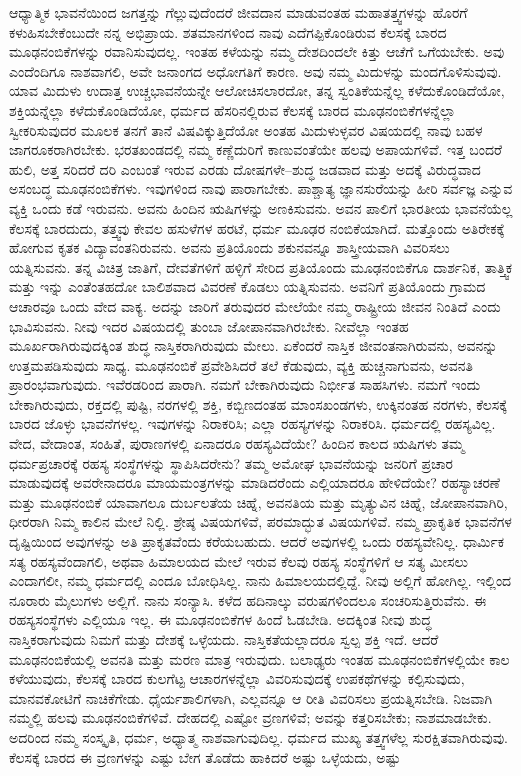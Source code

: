 ಆಧ್ಯಾತ್ಮಿಕ ಭಾವನೆಯಿಂದ ಜಗತ್ತನ್ನು ಗೆಲ್ಲುವುದೆಂದರೆ ಜೀವದಾನ ಮಾಡುವಂತಹ ಮಹಾತತ್ತ್ವಗಳನ್ನು ಹೊರಗೆ ಕಳುಹಿಸಬೇಕೆಂಬುದೇ ನನ್ನ ಅಭಿಪ್ರಾಯ. ಶತಮಾನಗಳಿಂದ ನಾವು ಎದೆಗಪ್ಪಿಕೊಂಡಿರುವ ಕೆಲಸಕ್ಕೆ ಬಾರದ ಮೂಢನಂಬಿಕೆಗಳನ್ನು ರವಾನಿಸುವುದಲ್ಲ. ಇಂತಹ ಕಳೆಯನ್ನು ನಮ್ಮ ದೇಶದಿಂದಲೇ ಕಿತ್ತು ಆಚೆಗೆ ಒಗೆಯಬೇಕು. ಅವು ಎಂದೆಂದಿಗೂ ನಾಶವಾಗಲಿ, ಅವೇ ಜನಾಂಗದ ಅಧೋಗತಿಗೆ ಕಾರಣ. ಅವು ನಮ್ಮ ಮಿದುಳನ್ನು ಮಂದಗೊಳಿಸುವುವು. ಯಾವ ಮಿದುಳು ಉದಾತ್ತ ಉಚ್ಚಭಾವನೆಯನ್ನೇ ಆಲೋಚಿಸಲಾರದೋ, ತನ್ನ ಸ್ವಂತಿಕೆಯನ್ನೆಲ್ಲ ಕಳೆದುಕೊಂಡಿದೆಯೋ, ಶಕ್ತಿಯನ್ನೆಲ್ಲಾ ಕಳೆದುಕೊಂಡಿದೆಯೋ, ಧರ್ಮದ ಹೆಸರಿನಲ್ಲಿರುವ ಕೆಲಸಕ್ಕೆ ಬಾರದ ಮೂಢನಂಬಿಕೆಗಳನ್ನೆಲ್ಲಾ ಸ್ವೀಕರಿಸುವುದರ ಮೂಲಕ ತನಗೆ ತಾನೆ ವಿಷವಿಕ್ಕುತ್ತಿದೆಯೋ ಅಂತಹ ಮಿದುಳುಳ್ಳವರ ವಿಷಯದಲ್ಲಿ ನಾವು ಬಹಳ ಜಾಗರೂಕರಾಗಿರಬೇಕು. ಭರತಖಂಡದಲ್ಲಿ ನಮ್ಮ ಕಣ್ಣೆದುರಿಗೆ ಕಾಣುವಂತೆಯೇ ಹಲವು ಅಪಾಯಗಳಿವೆ. ಇತ್ತ ಬಂದರೆ ಹುಲಿ, ಅತ್ತ ಸರಿದರೆ ದರಿ ಎಂಬಂತೆ ಇರುವ ಎರಡು ದೋಷಗಳೇ–ಶುದ್ಧ ಜಡವಾದ ಮತ್ತು ಅದಕ್ಕೆ ವಿರುದ್ಧವಾದ ಅಸಂಬದ್ಧ ಮೂಢನಂಬಿಕೆಗಳು. ಇವುಗಳಿಂದ ನಾವು ಪಾರಾಗಬೇಕು. ಪಾಶ್ಚಾತ್ಯ ಜ್ಞಾನಸುರೆಯನ್ನು ಹೀರಿ ಸರ್ವಜ್ಞ ಎನ್ನುವ ವ್ಯಕ್ತಿ ಒಂದು ಕಡೆ ಇರುವನು. ಅವನು ಹಿಂದಿನ ಋಷಿಗಳನ್ನು ಅಣಕಿಸುವನು. ಅವನ ಪಾಲಿಗೆ ಭಾರತೀಯ ಭಾವನೆಯೆಲ್ಲ ಕೆಲಸಕ್ಕೆ ಬಾರದುದು, ತತ್ತ್ವವು ಕೇವಲ ಹಸುಳೆಗಳ ಹರಟೆ, ಧರ್ಮ ಮೂಢರ ನಂಬಿಕೆಯಾಗಿದೆ. ಮತ್ತೊಂದು ಅತಿರೇಕಕ್ಕೆ ಹೋಗುವ ಕೃತಕ ವಿದ್ಯಾವಂತನಿರುವನು. ಅವನು ಪ್ರತಿಯೊಂದು ಶಕುನವನ್ನೂ ಶಾಸ್ತ್ರೀಯವಾಗಿ ವಿವರಿಸಲು ಯತ್ನಿಸುವನು. ತನ್ನ ವಿಚಿತ್ರ ಜಾತಿಗೆ, ದೇವತೆಗಳಿಗೆ ಹಳ್ಳಿಗೆ ಸೇರಿದ ಪ್ರತಿಯೊಂದು ಮೂಢನಂಬಿಕೆಗೂ ದಾರ್ಶನಿಕ, ತಾತ್ತ್ವಿಕ ಮತ್ತು ಇನ್ನು ಎಂತೆಂತಹದೋ ಬಾಲಿಶವಾದ ವಿವರಣೆ ಕೊಡಲು ಯತ್ನಿಸುವನು. ಅವನಿಗೆ ಪ್ರತಿಯೊಂದು ಗ್ರಾಮದ ಆಚಾರವೂ ಒಂದು ವೇದ ವಾಕ್ಯ. ಅದನ್ನು ಜಾರಿಗೆ ತರುವುದರ ಮೇಲೆಯೇ ನಮ್ಮ ರಾಷ್ಟ್ರೀಯ ಜೀವನ ನಿಂತಿದೆ ಎಂದು ಭಾವಿಸುವನು. ನೀವು ಇದರ ವಿಷಯದಲ್ಲಿ ತುಂಬಾ ಜೋಪಾನವಾಗಿರಬೇಕು. ನೀವೆಲ್ಲಾ ಇಂತಹ ಮೂರ್ಖರಾಗಿರುವುದಕ್ಕಿಂತ ಶುದ್ಧ ನಾಸ್ತಿಕರಾಗಿರುವುದು ಮೇಲು. ಏಕೆಂದರೆ ನಾಸ್ತಿಕ ಜೀವಂತನಾಗಿರುವನು, ಅವನನ್ನು ಉತ್ತಮಪಡಿಸುವುದು ಸಾಧ್ಯ. ಮೂಢನಂಬಿಕೆ ಪ್ರವೇಶಿಸಿದರೆ ತಲೆ ಕೆಡುವುದು, ವ್ಯಕ್ತಿ ಹುಚ್ಚನಾಗುವನು, ಅವನತಿ ಪ್ರಾರಂಭವಾಗುವುದು. ಇವೆರಡರಿಂದ ಪಾರಾಗಿ. ನಮಗೆ ಬೇಕಾಗಿರುವುದು ನಿರ್ಭೀತ ಸಾಹಸಿಗಳು. ನಮಗೆ ಇಂದು ಬೇಕಾಗಿರುವುದು, ರಕ್ತದಲ್ಲಿ ಪುಷ್ಟಿ, ನರಗಳಲ್ಲಿ ಶಕ್ತಿ, ಕಬ್ಬಿಣದಂತಹ ಮಾಂಸಖಂಡಗಳು, ಉಕ್ಕಿನಂತಹ ನರಗಳು, ಕೆಲಸಕ್ಕೆ ಬಾರದ ಜೊಳ್ಳು ಭಾವನೆಗಳಲ್ಲ. ಇವುಗಳನ್ನು ನಿರಾಕರಿಸಿ; ಎಲ್ಲಾ ರಹಸ್ಯಗಳನ್ನು ನಿರಾಕರಿಸಿ. ಧರ್ಮದಲ್ಲಿ ರಹಸ್ಯವಿಲ್ಲ. ವೇದ, ವೇದಾಂತ, ಸಂಹಿತೆ, ಪುರಾಣಗಳಲ್ಲಿ ಏನಾದರೂ ರಹಸ್ಯವಿದೆಯೇ? ಹಿಂದಿನ ಕಾಲದ ಋಷಿಗಳು ತಮ್ಮ ಧರ್ಮಪ್ರಚಾರಕ್ಕೆ ರಹಸ್ಯ ಸಂಸ್ಥೆಗಳನ್ನು ಸ್ಥಾಪಿಸಿದರೇನು? ತಮ್ಮ ಅಮೋಘ ಭಾವನೆಯನ್ನು ಜನರಿಗೆ ಪ್ರಚಾರ ಮಾಡುವುದಕ್ಕೆ ಅವರೇನಾದರೂ ಮಾಯಮಂತ್ರಗಳನ್ನು ಮಾಡಿದರೆಂದು ಎಲ್ಲಿಯಾದರೂ ಹೇಳಿದೆಯೇ? ರಹಸ್ಯಾಚರಣೆ ಮತ್ತು ಮೂಢನಂಬಿಕೆ ಯಾವಾಗಲೂ ದುರ್ಬಲತೆಯ ಚಿಹ್ನೆ, ಅವನತಿಯ ಮತ್ತು ಮೃತ್ಯುವಿನ ಚಿಹ್ನೆ, ಜೋಪಾನವಾಗಿರಿ, ಧೀರರಾಗಿ ನಿಮ್ಮ ಕಾಲಿನ ಮೇಲೆ ನಿಲ್ಲಿ. ಶ್ರೇಷ್ಠ ವಿಷಯಗಳಿವೆ, ಪರಮಾದ್ಭುತ ವಿಷಯಗಳಿವೆ. ನಮ್ಮ ಪ್ರಾಕೃತಿಕ ಭಾವನೆಗಳ ದೃಷ್ಟಿಯಿಂದ ಅವುಗಳನ್ನು ಅತಿ ಪ್ರಾಕೃತವೆಂದು ಕರೆಯಬಹುದು. ಆದರೆ ಅವುಗಳಲ್ಲಿ ಒಂದು ರಹಸ್ಯವೇನಿಲ್ಲ. ಧಾರ್ಮಿಕ ಸತ್ಯ ರಹಸ್ಯವೆಂದಾಗಲಿ, ಅಥವಾ ಹಿಮಾಲಯದ ಮೇಲೆ ಇರುವ ಕೆಲವು ರಹಸ್ಯ ಸಂಸ್ಥೆಗಳಿಗೆ ಆ ಸತ್ಯ ಮೀಸಲು ಎಂದಾಗಲೀ, ನಮ್ಮ ಧರ್ಮದಲ್ಲಿ ಎಂದೂ ಬೋಧಿಸಿಲ್ಲ. ನಾನು ಹಿಮಾಲಯದಲ್ಲಿದ್ದೆ. ನೀವು ಅಲ್ಲಿಗೆ ಹೋಗಿಲ್ಲ. ಇಲ್ಲಿಂದ ನೂರಾರು ಮೈಲುಗಳು ಅಲ್ಲಿಗೆ. ನಾನು ಸಂನ್ಯಾಸಿ. ಕಳೆದ ಹದಿನಾಲ್ಕು ವರುಷಗಳಿಂದಲೂ ಸಂಚರಿಸುತ್ತಿರುವೆನು. ಈ ರಹಸ್ಯಸಂಸ್ಥೆಗಳು ಎಲ್ಲಿಯೂ ಇಲ್ಲ. ಈ ಮೂಢನಂಬಿಕೆಗಳ ಹಿಂದೆ ಓಡಬೇಡಿ. ಅದಕ್ಕಿಂತ ನೀವು ಶುದ್ಧ ನಾಸ್ತಿಕರಾಗುವುದು ನಿಮಗೆ ಮತ್ತು ದೇಶಕ್ಕೆ ಒಳ್ಳೆಯದು. ನಾಸ್ತಿಕತೆಯಲ್ಲಾದರೂ ಸ್ವಲ್ಪ ಶಕ್ತಿ ಇದೆ. ಆದರೆ ಮೂಢನಂಬಿಕೆಯಲ್ಲಿ ಅವನತಿ ಮತ್ತು ಮರಣ ಮಾತ್ರ ಇರುವುದು. ಬಲಾಢ್ಯರು ಇಂತಹ ಮೂಢನಂಬಿಕೆಗಳಲ್ಲಿಯೇ ಕಾಲ ಕಳೆಯುವುದು, ಕೆಲಸಕ್ಕೆ ಬಾರದ ಕುಲಗೆಟ್ಟ ಆಚಾರಗಳನ್ನೆಲ್ಲಾ ವಿವರಿಸುವುದಕ್ಕೆ ಉಪಕಥೆಗಳನ್ನು ಕಲ್ಪಿಸುವುದು, ಮಾನವಕೋಟಿಗೆ ನಾಚಿಕೆಗೇಡು. ಧೈರ್ಯಶಾಲಿಗಳಾಗಿ, ಎಲ್ಲವನ್ನೂ ಆ ರೀತಿ ವಿವರಿಸಲು ಪ್ರಯತ್ನಿಸಬೇಡಿ. ನಿಜವಾಗಿ ನಮ್ಮಲ್ಲಿ ಹಲವು ಮೂಢನಂಬಿಕೆಗಳಿವೆ. ದೇಹದಲ್ಲಿ ಎಷ್ಟೋ ವ್ರಣಗಳಿವೆ; ಅವನ್ನು ಕತ್ತರಿಸಬೇಕು; ನಾಶಮಾಡಬೇಕು. ಅದರಿಂದ ನಮ್ಮ ಸಂಸ್ಕೃತಿ, ಧರ್ಮ, ಅಧ್ಯಾತ್ಮ ನಾಶವಾಗುವುದಿಲ್ಲ. ಧರ್ಮದ ಮುಖ್ಯ ತತ್ತ್ವಗಳೆಲ್ಲ ಸುರಕ್ಷಿತವಾಗಿರುವುವು. ಕೆಲಸಕ್ಕೆ ಬಾರದ ಈ ವ್ರಣಗಳನ್ನು ಎಷ್ಟು ಬೇಗ ತೊಡೆದು ಹಾಕಿದರೆ ಅಷ್ಟು ಒಳ್ಳೆಯದು, ಅಷ್ಟು 